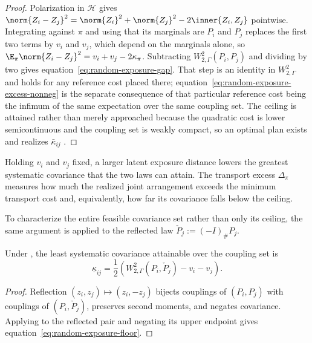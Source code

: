 \begin{proof}
  Polarization in $\mathcal H$ gives
  $\norm{Z_i-Z_j}^2=\norm{Z_i}^2+\norm{Z_j}^2-2\inner{Z_i,Z_j}$ pointwise.
  Integrating against $\pi$ and using that its marginals are $P_i$ and $P_j$
  replaces the first two terms by $v_i$ and $v_j$, which depend on the
  marginals alone, so $\E_\pi\norm{Z_i-Z_j}^2=v_i+v_j-2\kappa_\pi$.
  Subtracting $W_{2,\Gamma}^2(P_i,P_j)$ and dividing by two gives
  equation~\ref{eq:random-exposure-gap}. That step is an identity in
  $W_{2,\Gamma}^2$ and holds for any reference cost placed there;
  equation~\ref{eq:random-exposure-excess-nonneg} is the separate consequence
  of that particular reference cost being the infimum of the same expectation
  over the same coupling set. The ceiling is attained rather than merely
  approached because
  the quadratic cost is lower semicontinuous and the coupling set is weakly
  compact, so an optimal plan exists and realizes $\bar\kappa_{ij}$
  \citep[Ch.~1]{panaretos_invitation_2020}.
\end{proof}

Holding $v_i$ and $v_j$ fixed, a larger latent exposure distance lowers the
greatest systematic covariance that the two laws can attain.
The transport excess $\Delta_\pi$ measures how much the realized joint
arrangement exceeds the minimum transport cost and, equivalently, how far its
covariance falls below the ceiling.

To characterize the entire feasible covariance set rather than only its
ceiling, the same argument is applied to the reflected law $\check P_j:=(-I)_\#P_j$.

\begin{theorem}
  \label{thm:random-exposure-lower-endpoint}
  Under , the least systematic covariance
  attainable over the coupling set is
  \begin{equation}\label{eq:random-exposure-floor}
    \underline\kappa_{ij}
    =\frac12\left(W_{2,\Gamma}^{2}(P_i,\check P_j)-v_i-v_j\right).
  \end{equation}
\end{theorem}

\begin{proof}
  Reflection $(z_i,z_j)\mapsto(z_i,-z_j)$ bijects couplings of
  $(P_i,P_j)$ with couplings of $(P_i,\check P_j)$, preserves second moments,
  and negates covariance.
  Applying  to the reflected pair and
  negating its upper endpoint gives equation~\ref{eq:random-exposure-floor}.
\end{proof}

